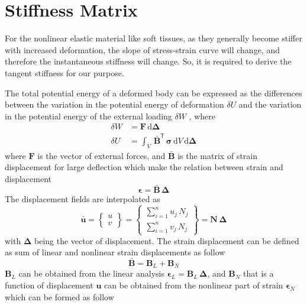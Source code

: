 \section{Stiffness Matrix}
For the nonlinear elastic material like soft tissues, as they generally become stiffer with increased deformation, the slope of stress-strain curve will change, and therefore the instantaneous stiffness will change. So, it is required to derive the tangent stiffness for our purpose. 

The total potential energy of a deformed body can be expressed as the differences between the variation in the potential energy of deformation $\delta{U}$ and the variation in the potential energy of the external loading $\delta{W}$ \cite{Yangetal10}, where 
\begin{subequations}
\begin{align}
\delta{W} & = \mathbf{F} \, \mathrm{d} \boldsymbol{\Delta}\\
\delta{U} & = \int_{V} \, \bar{\mathbf{B}}^{\mathsf{T}} \, \boldsymbol{\sigma} \, \mathrm{d} V \, \mathrm{d} \boldsymbol{\Delta}
\end{align}
\end{subequations}
where $\mathbf{F}$ is the vector of external forces, and $\bar{\mathbf{B}}$ is the matrix of strain displacement for large deflection which make the relation between strain and displacement 
\begin{equation}
\boldsymbol{\epsilon} = \bar{\mathbf{B}} \,  \boldsymbol{\Delta}
\label{strain}
\end{equation}
The displacement fields are interpolated as
\begin{equation}
\bar{\mathbf{ u}} = 
\begin{Bmatrix}
u \\
v     
\end{Bmatrix}
=
\begin{Bmatrix}
\sum_{i=1}^{n} u_j \, N_j \\
\sum_{i=1}^{n} v_j \, N_j     
\end{Bmatrix}
= \mathbf{N} \, \boldsymbol{\Delta}
\end{equation}
with $\boldsymbol{\Delta}$ being the vector of displacement. 
The strain displacement can be defined as sum of linear and nonlinear strain displacements as follow
\begin{equation}
\bar{\mathbf{B}} = \mathbf{B}_L + \mathbf{B}_N
\label{straindis}
\end{equation} 
$\mathbf{B}_L$ can be obtained from the linear analysis $\boldsymbol{\epsilon}_L = \mathbf{B}_L \, \boldsymbol{\Delta}$, and $\mathbf{B}_N$ that is a function of displacement $ \mathbf{u}$ can be obtained from the nonlinear part of strain $\boldsymbol{\epsilon}_N$ which can be formed as follow 
